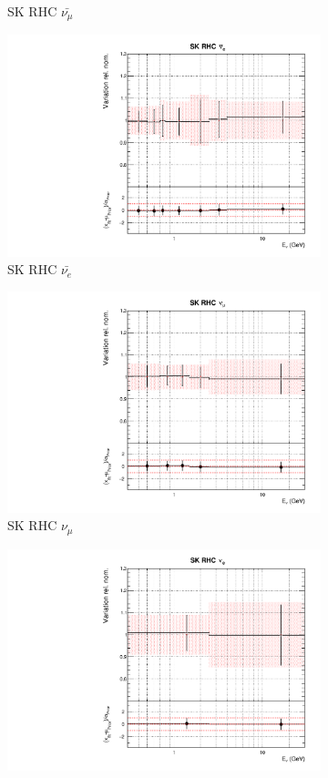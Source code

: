 \begin{figure}
\begin{subfigure}{0.24\textwidth}
  \caption{SK RHC $\bar{\nu_{\mu}}$}
  \label{fig:}
\end{subfigure}
\begin{subfigure}{0.24\textwidth}
  \centering
  \includegraphics[width=0.95\linewidth]{figs/asmvflux13}
  \caption{SK RHC $\bar{\nu_e}$}
  \label{fig:}
\end{subfigure}
\begin{subfigure}{0.24\textwidth}
  \centering
  \includegraphics[width=0.95\linewidth]{figs/asmvflux14}
  \caption{SK RHC $\nu_{\mu}$}
  \label{fig:}
\end{subfigure}
\begin{subfigure}{0.24\textwidth}
  \centering
  \includegraphics[width=0.95\linewidth]{figs/asmvflux15}

\end{subfigure}
\end{figure}
